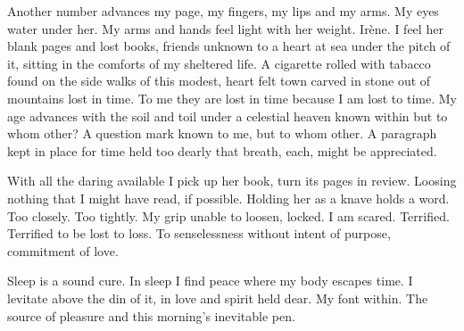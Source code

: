 

﻿Another number advances my page, my fingers, my lips and my arms.  My eyes water under her.  My arms and hands feel light with her weight.  Irène.  I feel her blank pages and lost books, friends unknown to a heart at sea under the pitch of it, sitting in the comforts of my sheltered life.  A cigarette rolled with tabacco found on the side walks of this modest, heart felt town carved in stone out of mountains lost in time.  To me they are lost in time because I am lost to time.  My age advances with the soil and toil under a celestial heaven known within but to whom other?  A question mark known to me, but to whom other.  A paragraph kept in place for time held too dearly that breath, each, might be appreciated.


With all the daring available I pick up her book, turn its pages in review.  Loosing nothing that I might have read, if possible.  Holding her as a knave holds a word.  Too closely.  Too tightly.  My grip unable to loosen, locked.  I am scared.  Terrified.  Terrified to be lost to loss.  To senselessness without intent of purpose, commitment of love.  


Sleep is a sound cure.  In sleep I find peace where my body escapes time.  I levitate above the din of it, in love and spirit held dear.  My font within.  The source of pleasure and this morning’s inevitable pen.
\bye
